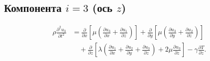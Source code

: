 \subsection*{Компонента $i=3$ (ось $z$)}

\begin{align}
\rho \frac{\partial^2 u_3}{\partial t^2}
&=
\frac{\partial}{\partial x}
\left[
\mu
\left(
\frac{\partial u_3}{\partial x}
+
\frac{\partial u_1}{\partial z}
\right)
\right]
+
\frac{\partial}{\partial y}
\left[
\mu
\left(
\frac{\partial u_3}{\partial y}
+
\frac{\partial u_2}{\partial z}
\right)
\right]
\nonumber\\
&\quad+
\frac{\partial}{\partial z}
\left[
\lambda
\left(
\frac{\partial u_1}{\partial x}
+
\frac{\partial u_2}{\partial y}
+
\frac{\partial u_3}{\partial z}
\right)
+
2\mu \frac{\partial u_3}{\partial z}
\right]
-
\gamma \frac{\partial T}{\partial z}.
\end{align}

